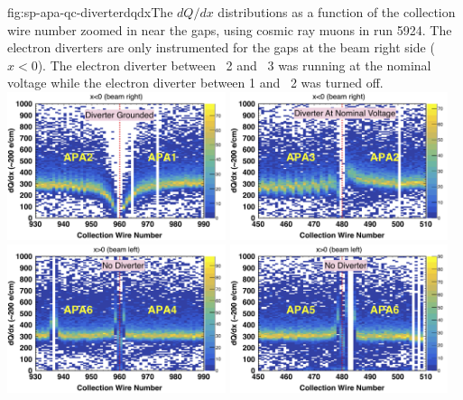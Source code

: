 \begin{dunefigure}
{fig:sp-apa-qc-diverterdqdx}{The $dQ/dx$ distributions as a function of the collection wire number zoomed in near the gaps, using cosmic ray muons in  run 5924. The electron diverters are only instrumented for the gaps at the beam right side ($x<0$). The electron diverter between ~2 and ~3 was running at the nominal voltage while the electron diverter between 1 and ~2 was turned off. }
\includegraphics[width=0.48\textwidth]{graphics/sp-apa-dQdxAPA12.png}
\includegraphics[width=0.48\textwidth]{graphics/sp-apa-dQdxAPA32.png}
\includegraphics[width=0.48\textwidth]{graphics/sp-apa-dQdxAPA46.png}
\includegraphics[width=0.48\textwidth]{graphics/sp-apa-dQdxAPA56.png}
\end{dunefigure}
    
